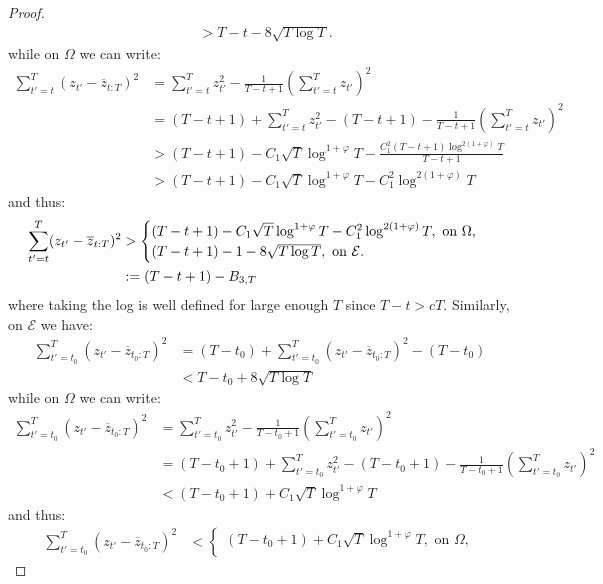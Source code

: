 \begin{proof}
\begin{align*}
    &> T-t - 8 \sqrt{T \log T}. 
\end{align*}
while on $\Omega$ we can write:
\begin{align*}
    \sum_{t'=t}^T (z_{t'} - \overline{z}_{t:T})^2 &= \sum_{t'=t}^T z^2_{t'} - \frac{1}{T-t+1} \left(\sum_{t'=t}^T z_{t'}\right)^2 \\
    &= (T-t+1) + \sum_{t'=t}^T z^2_{t'} - (T-t+1) - \frac{1}{T-t+1} \left(\sum_{t'=t}^T z_{t'}\right)^2 \\
    &>(T-t+1) - C_1\sqrt{T}\log^{1+\varphi} T - \frac{C^2_1 (T-t+1) \log^{2(1+\varphi)}T}{T-t+1} \\
    &> (T-t+1) - C_1\sqrt{T}\log^{1+\varphi} T - C^2_1 \log^{2(1+\varphi)}T
\end{align*}
and thus:
\small
\begin{align}
    \sum_{t'=t}^T (z_{t'} - \overline{z}_{t:T})^2  &>
    \begin{cases}
    (T - t +1) -  C_1\sqrt{T}\log^{1+\varphi} T - C^2_1 \log^{2(1+\varphi)}T, \text{ on } \Omega, \\
    (T - t + 1) - 1 - 8\sqrt{T \log T}, \text{ on } \mathcal{E}.
    \end{cases} \notag \\
    &:= (T- t +1) - B_{3,T}
\end{align}
\normalsize
where taking the log is well defined for large enough $T$ since $T-t > cT$. Similarly, on $\mathcal{E}$ we have:
\begin{align*}
    \sum_{t'=t_0}^T (z_{t'} - \overline{z}_{t_0:T})^2 &= (T-t_0) + \sum_{t'=t_0}^T (z_{t'} - \overline{z}_{t_0:T})^2 - (T-t_0) \\
    &< T-t_0 + 8 \sqrt{T \log T}  
\end{align*}
while on $\Omega$ we can write:
\begin{align*}
    \sum_{t'=t_0}^T (z_{t'} - \overline{z}_{t_0:T})^2 &= \sum_{t'=t_0}^T z^2_{t'} - \frac{1}{T-t_0+1} \left(\sum_{t'=t_0}^T z_{t'}\right)^2 \\
    &= (T-t_0+1) + \sum_{t'=t_0}^T z^2_{t'} - (T-t_0+1) - \frac{1}{T-t_0+1} \left(\sum_{t'=t_0}^T z_{t'}\right)^2 \\
    &< (T-t_0+1) + C_1\sqrt{T}\log^{1+\varphi} T 
\end{align*}
and thus:
\small
\begin{align}
    \sum_{t'=t_0}^T (z_{t'} - \overline{z}_{t_0:T})^2 &< 
    \begin{cases}
    (T - t_0 +1) +  C_1\sqrt{T}\log^{1+\varphi} T , \text{ on } \Omega, \\

\end{cases}
\end{align}
\end{proof}
